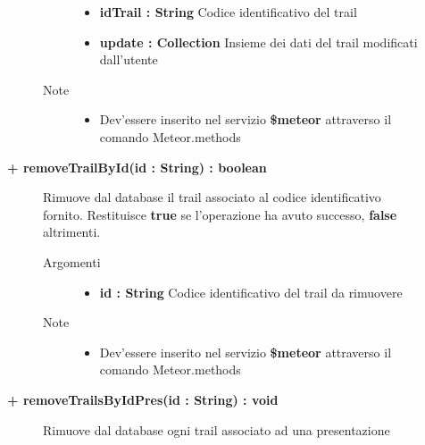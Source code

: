 \begin{description}
\begin{description}
\begin{description}
\begin{itemize}
					\item \textbf{idTrail : String		} \hfill
					Codice identificativo del trail
					\item \textbf{update : Collection		} \hfill
					Insieme dei dati del trail modificati dall'utente
					
				\end{itemize}
			\item[Note] \hfill
			\begin{itemize}
					\item Dev'essere inserito nel servizio \textbf{\$meteor} attraverso il comando Meteor.methods
				\end{itemize}
		\end{description}
	\end{description}
	
	\begin{description}
		\item[\textbf{\color{blue}+ removeTrailById(id : String) : boolean			}] \hfill
			Rimuove dal database il trail associato al codice identificativo fornito. Restituisce \textbf{true} se l'operazione ha avuto successo, \textbf{false} altrimenti.
			
		\begin{description}
			\item[Argomenti] \hfill
				\begin{itemize}
				
					\item \textbf{id : String		} \hfill
					Codice identificativo del trail da rimuovere
					
				\end{itemize}
			\item[Note] \hfill
			\begin{itemize}
					\item Dev'essere inserito nel servizio \textbf{\$meteor} attraverso il comando Meteor.methods
				\end{itemize}
		\end{description}
	\end{description}
	
	\begin{description}
		\item[\textbf{\color{blue}+ removeTrailsByIdPres(id : String) : void			}] \hfill
			Rimuove dal database ogni trail associato ad una presentazione
			

\end{description}
\end{description}
